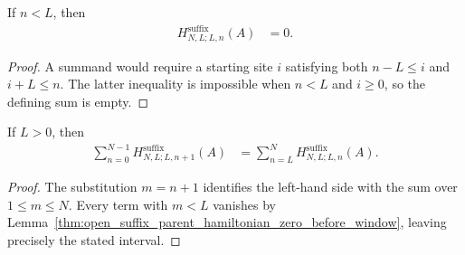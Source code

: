\begin{lemma}
    \label{thm:open_suffix_parent_hamiltonian_zero_before_window}
    \leanok
    If $n<L$, then
    \begin{align}
        H^{\mathrm{suffix}}_{N,L;L,n}(A) & =0.
        \label{eq:open_suffix_parent_hamiltonian_zero_before_window}
    \end{align}
\end{lemma}

\begin{proof}
    \leanok
    A summand would require a starting site $i$ satisfying both $n-L\leq i$
    and $i+L\leq n$.  The latter inequality is impossible when $n<L$ and
    $i\geq0$, so the defining sum is empty.
\end{proof}

\begin{lemma}
    \label{thm:open_suffix_parent_hamiltonian_range_shift}
    \leanok
    If $L>0$, then
    \begin{align}
        \sum_{n=0}^{N-1}H^{\mathrm{suffix}}_{N,L;L,n+1}(A)
         & =\sum_{n=L}^{N}H^{\mathrm{suffix}}_{N,L;L,n}(A).
        \label{eq:open_suffix_parent_hamiltonian_range_shift}
    \end{align}
\end{lemma}

\begin{proof}
    \leanok
    The substitution $m=n+1$ identifies the left-hand side with the sum over
    $1\leq m\leq N$.  Every term with $m<L$ vanishes by
    Lemma~\ref{thm:open_suffix_parent_hamiltonian_zero_before_window}, leaving
    precisely the stated interval.
\end{proof}

